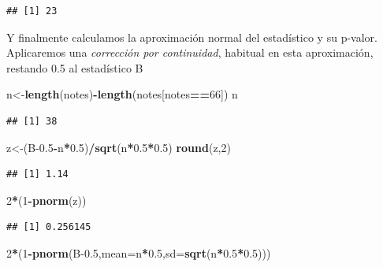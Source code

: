 \documentclass[
]{article}
\newenvironment{Shaded}{\begin{snugshade}}{\end{snugshade}}
\newcommand{\AttributeTok}[1]{\textcolor[rgb]{0.13,0.29,0.53}{#1}}
\newcommand{\DecValTok}[1]{\textcolor[rgb]{0.00,0.00,0.81}{#1}}
\newcommand{\FloatTok}[1]{\textcolor[rgb]{0.00,0.00,0.81}{#1}}
\newcommand{\FunctionTok}[1]{\textcolor[rgb]{0.13,0.29,0.53}{\textbf{#1}}}
\newcommand{\NormalTok}[1]{#1}
\newcommand{\OtherTok}[1]{\textcolor[rgb]{0.56,0.35,0.01}{#1}}
\newcommand{\SpecialCharTok}[1]{\textcolor[rgb]{0.81,0.36,0.00}{\textbf{#1}}}
\begin{document}
\begin{verbatim}
## [1] 23
\end{verbatim}

Y finalmente calculamos la aproximación normal del estadístico y su p-valor. Aplicaremos una \emph{corrección por continuidad}, habitual en esta aproximación, restando 0.5 al estadístico B

\begin{Shaded}
\begin{Highlighting}[]
\NormalTok{n}\OtherTok{\textless{}{-}}\FunctionTok{length}\NormalTok{(notes)}\SpecialCharTok{{-}}\FunctionTok{length}\NormalTok{(notes[notes}\SpecialCharTok{==}\DecValTok{66}\NormalTok{])}
\NormalTok{n}
\end{Highlighting}
\end{Shaded}

\begin{verbatim}
## [1] 38
\end{verbatim}

\begin{Shaded}
\begin{Highlighting}[]
\NormalTok{z}\OtherTok{\textless{}{-}}\NormalTok{(B}\FloatTok{{-}0.5}\SpecialCharTok{{-}}\NormalTok{n}\SpecialCharTok{*}\FloatTok{0.5}\NormalTok{)}\SpecialCharTok{/}\FunctionTok{sqrt}\NormalTok{(n}\SpecialCharTok{*}\FloatTok{0.5}\SpecialCharTok{*}\FloatTok{0.5}\NormalTok{)}
\FunctionTok{round}\NormalTok{(z,}\DecValTok{2}\NormalTok{)}
\end{Highlighting}
\end{Shaded}

\begin{verbatim}
## [1] 1.14
\end{verbatim}

\begin{Shaded}
\begin{Highlighting}[]
\DecValTok{2}\SpecialCharTok{*}\NormalTok{(}\DecValTok{1}\SpecialCharTok{{-}}\FunctionTok{pnorm}\NormalTok{(z))}
\end{Highlighting}
\end{Shaded}

\begin{verbatim}
## [1] 0.256145
\end{verbatim}

\begin{Shaded}
\begin{Highlighting}[]
\DecValTok{2}\SpecialCharTok{*}\NormalTok{(}\DecValTok{1}\SpecialCharTok{{-}}\FunctionTok{pnorm}\NormalTok{(B}\FloatTok{{-}0.5}\NormalTok{,}\AttributeTok{mean=}\NormalTok{n}\SpecialCharTok{*}\FloatTok{0.5}\NormalTok{,}\AttributeTok{sd=}\FunctionTok{sqrt}\NormalTok{(n}\SpecialCharTok{*}\FloatTok{0.5}\SpecialCharTok{*}\FloatTok{0.5}\NormalTok{)))}
\end{Highlighting}
\end{Shaded}
\end{document}
